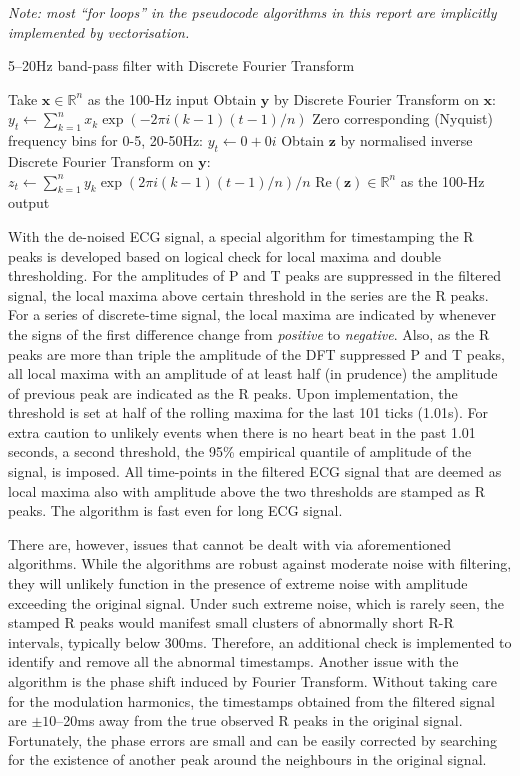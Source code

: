 \documentclass[
]{article}
\begin{document}
\emph{Note: most ``for loops'' in the pseudocode algorithms in this
report are implicitly implemented by vectorisation.}

\begin{algorithm}
\caption{5--20Hz band-pass filter with Discrete Fourier Transform}
\begin{algorithmic}[1]
\STATE Take $\mathbf{x} \in \mathbb{R}^n$ as the 100-Hz input
\STATE Obtain $\mathbf{y}$ by Discrete Fourier Transform on $\mathbf{x}$:
\STATE $y_t \leftarrow \sum_{k = 1}^n{x_k}\exp(-2\pi i(k - 1)(t - 1) / n)$
\ENDFOR
\STATE Zero corresponding (Nyquist) frequency bins for 0-5, 20-50Hz:
\STATE $y_t \leftarrow 0 + 0i$
\ENDFOR
\STATE Obtain $\mathbf{z}$ by normalised inverse Discrete Fourier Transform on $\mathbf{y}$:
\STATE $z_t \leftarrow \sum_{k = 1}^n{y_k}\exp(2\pi i(k - 1)(t - 1) / n) / n$
\ENDFOR
\RETURN $\text{Re}(\mathbf{z}) \in \mathbb{R}^n$ as the 100-Hz output
\end{algorithmic}
\end{algorithm}

With the de-noised ECG signal, a special algorithm for timestamping the
R peaks is developed based on logical check for local maxima and double
thresholding. For the amplitudes of P and T peaks are suppressed in the
filtered signal, the local maxima above certain threshold in the series
are the R peaks. For a series of discrete-time signal, the local maxima
are indicated by whenever the signs of the first difference change from
\emph{positive} to \emph{negative}. Also, as the R peaks are more than
triple the amplitude of the DFT suppressed P and T peaks, all local
maxima with an amplitude of at least half (in prudence) the amplitude of
previous peak are indicated as the R peaks. Upon implementation, the
threshold is set at half of the rolling maxima for the last 101 ticks
(1.01s). For extra caution to unlikely events when there is no heart
beat in the past 1.01 seconds, a second threshold, the 95\% empirical
quantile of amplitude of the signal, is imposed. All time-points in the
filtered ECG signal that are deemed as local maxima also with amplitude
above the two thresholds are stamped as R peaks. The algorithm is fast
even for long ECG signal.

There are, however, issues that cannot be dealt with via aforementioned
algorithms. While the algorithms are robust against moderate noise with
filtering, they will unlikely function in the presence of extreme noise
with amplitude exceeding the original signal. Under such extreme noise,
which is rarely seen, the stamped R peaks would manifest small clusters
of abnormally short R-R intervals, typically below 300ms. Therefore, an
additional check is implemented to identify and remove all the abnormal
timestamps. Another issue with the algorithm is the phase shift induced
by Fourier Transform. Without taking care for the modulation harmonics,
the timestamps obtained from the filtered signal are \(\pm10\)--20ms
away from the true observed R peaks in the original signal. Fortunately,
the phase errors are small and can be easily corrected by searching for
the existence of another peak around the neighbours in the original
signal.
\end{document}

